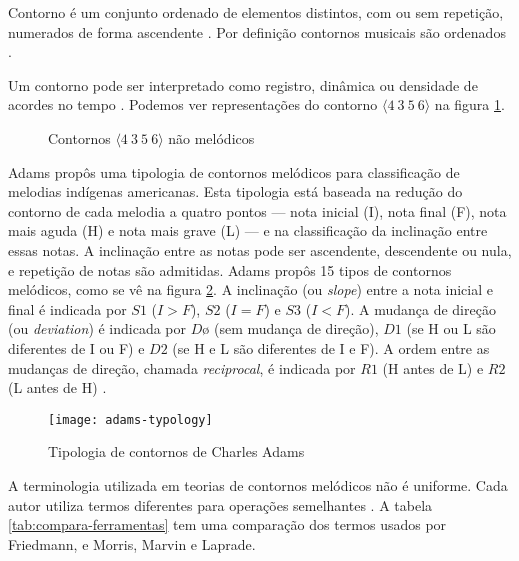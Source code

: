\documentclass[12pt,brazil]{book}
\newcommand{\eng}[1]{\textit{#1}}
\newcommand{\contorno}[1]{$\langle #1 \rangle$}
\begin{document}
Contorno é um conjunto ordenado de elementos distintos, com ou sem
repetição, numerados de forma ascendente
\cite[p. 206]{morris93:directions}. Por definição contornos musicais
são ordenados \cite[p. 228]{marvin.ea87:relating}.

Um contorno pode ser interpretado como registro, dinâmica ou densidade
de acordes no tempo \cite[p. 206]{morris93:directions}
\cite[p. 22]{clifford95:contour}. Podemos ver representações do
contorno \contorno{4\:3\:5\:6} na figura
\ref{fig:non-melodic-contours}.

\begin{figure}
  \centering
  \qquad
  \qquad

  \caption{Contornos \contorno{4\:3\:5\:6} não melódicos}
  \label{fig:non-melodic-contours}
\end{figure}

Adams propôs uma tipologia de contornos melódicos para classificação
de melodias indígenas americanas. Esta tipologia está baseada na
redução do contorno de cada melodia a quatro pontos --- nota inicial
(I), nota final (F), nota mais aguda (H) e nota mais grave (L) --- e
na classificação da inclinação entre essas notas. A inclinação entre
as notas pode ser ascendente, descendente ou nula, e repetição de
notas são admitidas. Adams propôs 15 tipos de contornos melódicos,
como se vê na figura \ref{fig:adams-typology}. A inclinação (ou
\eng{slope}) entre a nota inicial e final é indicada por $S1$ ($I >
F$), $S2$ ($I = F$) e $S3$ ($I < F$). A mudança de direção (ou
\eng{deviation}) é indicada por $Dø$ (sem mudança de direção), $D1$
(se H ou L são diferentes de I ou F) e $D2$ (se H e L são diferentes
de I e F). A ordem entre as mudanças de direção, chamada
\eng{reciprocal}, é indicada por $R1$ (H antes de L) e $R2$ (L antes
de H) \cite{adams76:melodic}.

\begin{figure}
  \centering
  \texttt{[image: adams-typology]}
  \caption{Tipologia de contornos de Charles Adams
    \cite{adams76:melodic}}
  \label{fig:adams-typology}
\end{figure}

A terminologia utilizada em teorias de contornos melódicos não é
uniforme. Cada autor utiliza termos diferentes para operações
semelhantes \cite{friedmann87:response}. A tabela
\ref{tab:compara-ferramentas} tem uma comparação dos termos usados por
Friedmann, e Morris, Marvin e Laprade.
\end{document}
